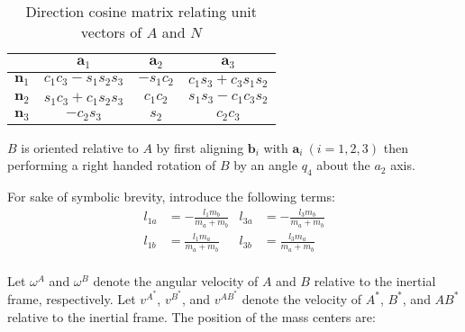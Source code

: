 \documentclass[letterpaper,11pt]{article}
\newcommand{\bs}[1]{ \boldsymbol{ #1 } }
\begin{document}
\begin{table}[!h]
  \begin{center}
    \begin{tabular}{l|ccc}
      & $\bs{a}_1$ & $\bs{a}_2$ & $\bs{a}_3$ \\
      \hline
      $\bs{n}_1$ & $c_1c_3 - s_1s_2s_3$ & $-s_1c_2$ & $c_1s_3 + c_3s_1s_2$ \\
      $\bs{n}_2$ & $s_1c_3 + c_1s_2s_3$ & $ c_1c_2$& $s_1s_3 - c_1c_3s_2$ \\
      $\bs{n}_3$ & $-c_2s_3$ & $s_2$& $c_2c_3$
    \end{tabular}
  \end{center}
  \caption{Direction cosine matrix relating unit vectors of $A$ and $N$}
  \label{directioncosines}
\end{table}

$B$ is oriented relative to $A$ by first aligning $\bs{b}_i$ with $\bs{a}_i \:
(i = 1,2,3)$ then performing a right handed rotation of $B$ by an angle $q_4$ about
the $a_2$ axis.

For sake of symbolic brevity, introduce the following terms:
\begin{align*}
  l_{1a} & = -\frac{l_1 m_b}{m_a + m_b} &
  l_{3a} & = -\frac{l_3 m_b}{m_a + m_b} \\
  l_{1b} & = \frac{l_1 m_a}{m_a + m_b} &
  l_{3b} & = \frac{l_3 m_a}{m_a + m_b} \\
\end{align*}

Let $\omega^A$ and $\omega^B$ denote the angular velocity of $A$ and $B$
relative to the inertial frame, respectively.  Let $v^{A^*}$, $v^{B^*}$, and $v^{AB^*}$ denote the
velocity of $A^*$, $B^*$, and $AB^*$ relative to the inertial frame.
The position of the mass centers are:
\end{document}
